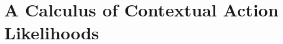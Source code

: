 \newcommand{\actionCalcSec}{A Calculus of Contextual Action Likelihoods}
\section{\protect\actionCalcSec}
\label{sec:action-calculus}
